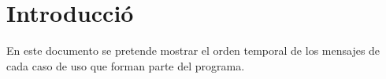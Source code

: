 \section{Introducció}\label{sec:intro}

\begin{flushleft}
En este documento se pretende mostrar el orden temporal de los mensajes de cada caso de uso que forman parte del programa.
\end{flushleft}
